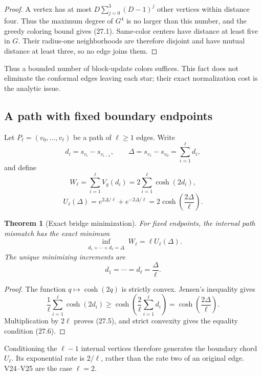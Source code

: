 \documentclass[11pt]{article}
\newtheorem{theorem}{Theorem}[section]
\theoremstyle{remark}
\begin{document}
\begin{proof}
A vertex has at most
\(D\sum_{j=0}^{3}(D-1)^j\) other vertices within distance four.
Thus the maximum degree of \(G^4\) is no larger than this number, and
the greedy coloring bound gives (27.1).  Same-color centers have
distance at least five in \(G\).  Their radius-one neighborhoods are
therefore disjoint and have mutual distance at least three, so no edge
joins them.
\end{proof}

Thus a bounded number of block-update colors suffices.  This fact does
not eliminate the conformal edges leaving each star; their exact
normalization cost is the analytic issue.

\subsection{A path with fixed boundary endpoints}

Let \(P_\ell=(v_0,\ldots,v_\ell)\) be a path of \(\ell\geq1\) edges.
Write
\[
 d_i=s_{v_i}-s_{v_{i-1}},\qquad
 \Delta=s_{v_\ell}-s_{v_0}=\sum_{i=1}^{\ell}d_i,   \tag{27.2}
\]
and define
\[
 W_\ell=\sum_{i=1}^{\ell}V_g(d_i)
 =2\sum_{i=1}^{\ell}\cosh(2d_i),                  \tag{27.3}
\]
\[
 U_\ell(\Delta)
 =e^{2\Delta/\ell}+e^{-2\Delta/\ell}
 =2\cosh\left(\frac{2\Delta}{\ell}\right).       \tag{27.4}
\]

\begin{theorem}[Exact bridge minimization]
\label{thm:v17v27-bridge}
For fixed endpoints, the internal path mismatch has the exact minimum
\[
 \inf_{\substack{d_1+\cdots+d_\ell=\Delta}}
 W_\ell
 =\ell U_\ell(\Delta).                             \tag{27.5}
\]
The unique minimizing increments are
\[
 d_1=\cdots=d_\ell=\frac\Delta\ell.                \tag{27.6}
\]
\end{theorem}

\begin{proof}
The function \(q\mapsto\cosh(2q)\) is strictly convex.  Jensen's
inequality gives
\[
 \frac1\ell\sum_{i=1}^{\ell}\cosh(2d_i)
 \geq\cosh\left(\frac2\ell\sum_{i=1}^{\ell}d_i\right)
 =\cosh\left(\frac{2\Delta}{\ell}\right).         \tag{27.7}
\]
Multiplication by \(2\ell\) proves (27.5), and strict convexity gives
the equality condition (27.6).
\end{proof}

Conditioning the \(\ell-1\) internal vertices therefore generates the
boundary chord \(U_\ell\).  Its exponential rate is \(2/\ell\), rather
than the rate two of an original edge.  V24--V25 are the case
\(\ell=2\).
\end{document}
